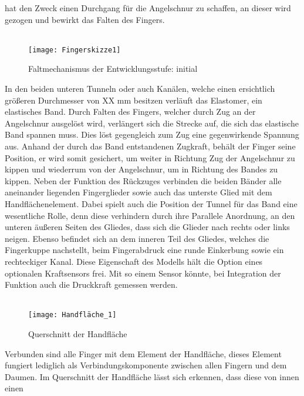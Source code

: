 \documentclass[titlepage,12pt,twoside]{article}
\begin{document}
hat den Zweck einen Durchgang für die Angelschnur zu schaffen, an dieser wird gezogen 
und bewirkt das Falten des Fingers. \\
\\
\begin{figure}[H]
	\begin{center}
		\scalebox{1}
		{\texttt{[image: Fingerskizze1]}}
		\caption{Faltmechanismus der Entwicklungsstufe: initial}
		\label{fig:Fingerskizze1}		
	\end{center}
\end{figure}
\hfill \break
In den beiden unteren Tunneln oder auch Kanälen, 
welche einen ersichtlich größeren Durchmesser von XX mm besitzen verläuft das 
Elastomer, ein elastisches Band. Durch Falten des Fingers, welcher durch Zug an der 
Angelschnur ausgelöst wird, verlängert sich die Strecke auf, die sich das elastische 
Band spannen muss. Dies löst gegengleich zum Zug eine gegenwirkende Spannung aus. 
Anhand der durch das Band entstandenen Zugkraft, behält der Finger seine Position, 
er wird somit gesichert, um weiter in Richtung Zug der Angelschnur zu kippen und 
wiederrum von der Angelschnur, um in Richtung des Bandes zu kippen. Neben der 
Funktion des Rückzuges verbinden die beiden Bänder alle aneinander liegenden 
Fingerglieder sowie auch das unterste Glied mit dem Handflächenelement. Dabei 
spielt auch die Position der Tunnel für das Band eine wesentliche Rolle, denn 
diese verhindern durch ihre Parallele Anordnung, an den unteren äußeren Seiten 
des Gliedes, dass sich die Glieder nach rechts oder links neigen. 
Ebenso befindet sich an dem inneren Teil des Gliedes, welches die Fingerkuppe 
nachstellt, beim Fingerabdruck eine runde Einkerbung sowie ein rechteckiger Kanal. 
Diese Eigenschaft des Modells hält die Option eines optionalen Kraftsensors frei. 
Mit so einem Sensor könnte, bei Integration der Funktion auch die Druckkraft 
gemessen werden. \\
\\
\begin{figure}[H]
	\begin{center}
		\scalebox{0.8}
		{\texttt{[image: Handfläche\_1]}}
		\caption{Querschnitt der Handfläche}
		\label{fig:Handfläche_1}		
	\end{center}
\end{figure}
\hfill \break
Verbunden sind alle Finger mit dem Element der Handfläche, dieses Element fungiert 
lediglich als Verbindungskomponente zwischen allen Fingern und dem Daumen. 
Im Querschnitt der Handfläche lässt sich erkennen, dass diese von innen einen 
\end{document}
